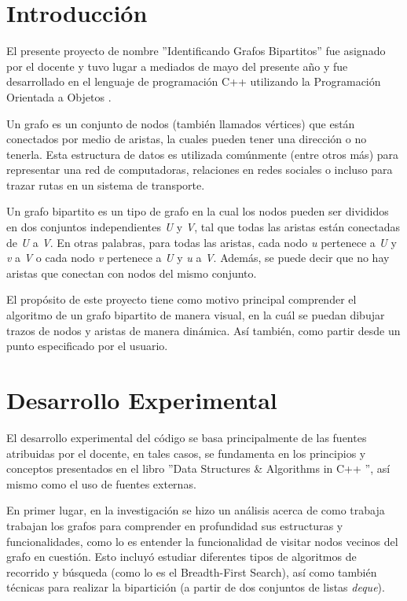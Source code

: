 \documentclass[conference]{IEEEtran}
\begin{document}
\section{Introducción}
El presente proyecto de nombre ''Identificando Grafos Bipartitos'' fue asignado por el docente y tuvo lugar a mediados de mayo del presente año y fue desarrollado en el lenguaje de programación C++ \cite{cpp-definicion} utilizando la Programación Orientada a Objetos \cite{poo-definicion}. 

Un grafo \cite{grafo} es un conjunto de nodos (también llamados vértices) que están conectados por medio de aristas, la cuales pueden tener una dirección o no tenerla. Esta estructura de datos es utilizada comúnmente (entre otros más) para representar una red de computadoras, relaciones en redes sociales o incluso para trazar rutas en un sistema de transporte.

Un grafo bipartito \cite{grafo-bipartito} es un tipo de grafo en la cual los nodos pueden ser divididos en dos conjuntos independientes \textit{U} y \textit{V}, tal que todas las aristas están conectadas de \textit{U} a \textit{V}. En otras palabras, para todas las aristas, cada nodo \textit{u} pertenece a \textit{U} y \textit{v} a \textit{V} o cada nodo \textit{v} pertenece a \textit{U} y \textit{u} a \textit{V}. Además, se puede decir que no hay aristas que conectan con nodos del mismo conjunto.

El propósito de este proyecto tiene como motivo principal comprender el algoritmo de un grafo bipartito de manera visual, en la cuál se puedan dibujar trazos de nodos y aristas de manera dinámica. Así también, como partir desde un punto especificado por el usuario.

\section{Desarrollo Experimental}
El desarrollo experimental del código se basa principalmente de las fuentes atribuidas por el docente, en tales casos, se fundamenta en los principios y conceptos presentados en el libro ''Data Structures \& Algorithms in C++ \cite{book-data_structures}'', así mismo como el uso de fuentes externas.

En primer lugar, en la investigación se hizo un análisis acerca de como trabaja trabajan los grafos para comprender en profundidad sus estructuras y funcionalidades, como lo es entender la funcionalidad de visitar nodos vecinos del grafo en cuestión. Esto incluyó estudiar diferentes tipos de algoritmos de recorrido y búsqueda (como lo es el Breadth-First Search), así como también técnicas para realizar la bipartición (a partir de dos conjuntos de listas \textit{deque}). 
\end{document}
